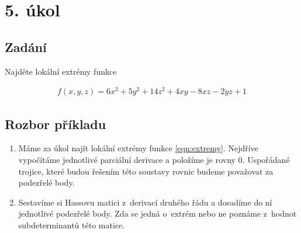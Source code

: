 \section{5. úkol}
\subsection*{Zadání}
Najděte lokální extrémy funkce 

\begin{eqnarray}
f(x,y,z) = 6x^2 + 5y^2 + 14z^2 + 4xy - 8xz - 2yz +1
\label{eqn:extremy}
\end{eqnarray}
\subsection*{Rozbor příkladu}
\begin{enumerate}
	\item Máme za úkol najít lokální extrémy funkce \ref{eqn:extremy}. Nejdříve vypočítáme jednotlivé parciální derivace a položíme je rovny $0$. Uspořádané trojice, které budou řešením této soustavy rovnic budeme považovat za podezřelé body.
	\item Sestavíme si Hassovu matici z~derivací druhého řádu a dosadíme do ní jednotlivé podezřelé body. Zda se jedná o~extrém nebo ne poznáme z~hodnot subdeterminantů této matice.
\end{enumerate}
